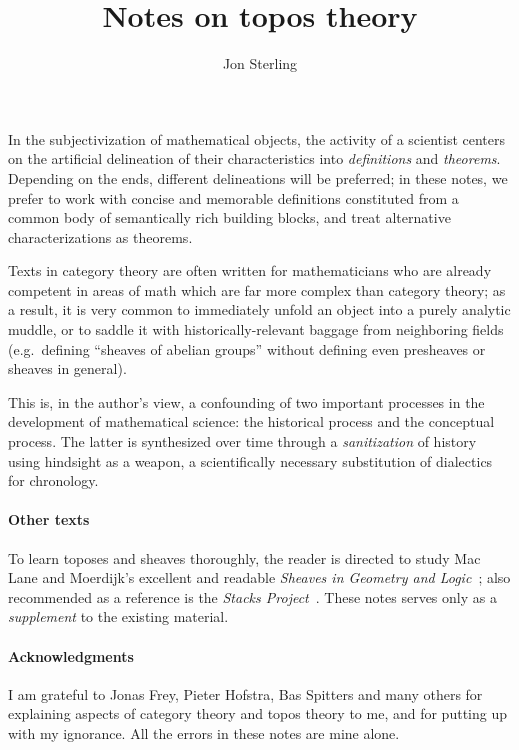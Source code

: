 \documentclass{article}
\title{Notes on topos theory}
\author{Jon Sterling}
\affil{Carnegie Mellon University}
\date{}
\begin{document}
\maketitle

In the subjectivization of mathematical objects, the activity of a
scientist centers on the artificial delineation of their
characteristics into \emph{definitions} and \emph{theorems}. Depending
on the ends, different delineations will be preferred; in these notes,
we prefer to work with concise and memorable definitions constituted
from a common body of semantically rich building blocks, and treat
alternative characterizations as theorems.

Texts in category theory are often written for mathematicians who
are already competent in areas of math which are far more complex than
category theory; as a result, it is very common to immediately unfold
an object into a purely analytic muddle, or to saddle it with
historically-relevant baggage from neighboring fields (e.g.\ defining
``sheaves of abelian groups'' without defining even presheaves or
sheaves in general).

This is, in the author's view, a confounding of two important
processes in the development of mathematical science: the historical
process and the conceptual process. The latter is synthesized over
time through a \emph{sanitization} of history using hindsight as a
weapon, a scientifically necessary substitution of dialectics for
chronology.

\paragraph{Other texts}
To learn toposes and sheaves thoroughly, the reader is directed to
study Mac Lane and Moerdijk's excellent and readable \emph{Sheaves in
  Geometry and Logic}~\cite{maclane-moerdijk:1992}; also recommended
as a reference is the \emph{Stacks
  Project}~\cite{stacks-project}. These notes serves only as a
\emph{supplement} to the existing material.

\paragraph{Acknowledgments}

I am grateful to Jonas Frey, Pieter Hofstra, Bas Spitters and many
others for explaining aspects of category theory and topos theory to
me, and for putting up with my ignorance. All the errors in these
notes are mine alone.
\end{document}
